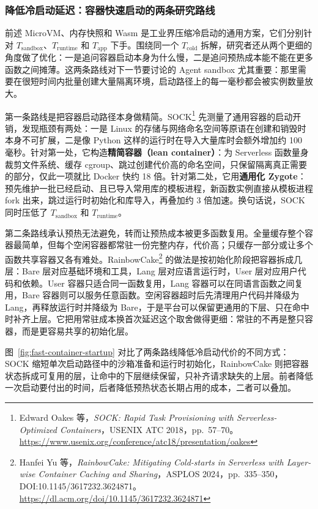 \subsubsection{降低冷启动延迟：容器快速启动的两条研究路线}
\label{sec6:fast-container-startup}

前述 MicroVM、内存快照和 Wasm 是工业界压缩冷启动的通用方案，它们分别针对 $T_{\mathrm{sandbox}}$、$T_{\mathrm{runtime}}$ 和 $T_{\mathrm{app}}$ 下手。围绕同一个 $T_{\mathrm{cold}}$ 拆解，研究者还从两个更细的角度做了优化：一是追问容器启动本身为什么慢，二是追问预热成本能不能在更多函数之间摊薄。这两条路线对下一节要讨论的 Agent sandbox 尤其重要：那里需要在很短时间内批量创建大量隔离环境，启动路径上的每一毫秒都会被实例数量放大。

第一条路线是把容器启动路径本身做精简。SOCK\footnote{Edward Oakes 等，\emph{SOCK: Rapid Task Provisioning with Serverless-Optimized Containers}，USENIX ATC 2018，pp.~57--70。\url{https://www.usenix.org/conference/atc18/presentation/oakes}} 先测量了通用容器的启动开销，发现瓶颈有两处：一是 Linux 的存储与网络命名空间等原语在创建和销毁时本身不可扩展，二是像 Python 这样的运行时在导入大量库时会额外增加约 100 毫秒。针对第一处，它构造\textbf{精简容器（lean container）}：为 Serverless 函数量身裁剪文件系统、缓存 cgroup、跳过创建代价高的命名空间，只保留隔离真正需要的部分，仅此一项就比 Docker 快约 18 倍。针对第二处，它用\textbf{通用化 Zygote}：预先维护一批已经启动、且已导入常用库的模板进程，新函数实例直接从模板进程 fork 出来，跳过运行时初始化和库导入，再叠加约 3 倍加速。换句话说，SOCK 同时压低了 $T_{\mathrm{sandbox}}$ 和 $T_{\mathrm{runtime}}$。

第二条路线承认预热无法避免，转而让预热成本被更多函数复用。全量缓存整个容器最简单，但每个空闲容器都常驻一份完整内存，代价高；只缓存一部分或让多个函数共享容器又各有难处。RainbowCake\footnote{Hanfei Yu 等，\emph{RainbowCake: Mitigating Cold-starts in Serverless with Layer-wise Container Caching and Sharing}，ASPLOS 2024，pp.~335--350，DOI:10.1145/3617232.3624871。\url{https://dl.acm.org/doi/10.1145/3617232.3624871}} 的做法是按初始化阶段把容器拆成几层：Bare 层对应基础环境和工具，Lang 层对应语言运行时，User 层对应用户代码和依赖。User 容器只适合同一函数复用，Lang 容器可以在同语言函数之间复用，Bare 容器则可以服务任意函数。空闲容器超时后先清理用户代码并降级为 Lang，再释放运行时并降级为 Bare，于是平台可以保留更通用的下层、只在命中时补齐上层。它把用常驻成本换首次延迟这个取舍做得更细：常驻的不再是整只容器，而是更容易共享的初始化层。

图~\ref{fig:fast-container-startup} 对比了两条路线降低冷启动代价的不同方式：SOCK 缩短单次启动路径中的沙箱准备和运行时初始化，RainbowCake 则把容器状态拆成可复用的层，让命中的下层继续保留，只补齐请求缺失的上层。前者降低一次启动要付出的时间，后者降低预热状态长期占用的成本，二者可以叠加。


